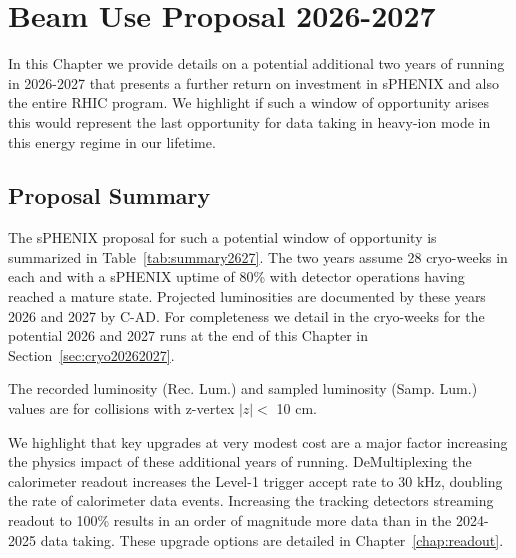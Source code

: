 \chapter{Beam Use Proposal 2026-2027}
\label{chap:beam_use_proposal_extra}

In this Chapter we provide details on a potential additional two years of running in 2026-2027 that presents a further return on investment in sPHENIX and also the entire RHIC program.   We highlight if such a window of opportunity arises this would represent the last opportunity for data taking in heavy-ion mode in this energy regime in our lifetime. 

\section{Proposal Summary}

The sPHENIX proposal for such a potential window of opportunity is summarized in Table~\ref{tab:summary2627}.   The two years assume 28 cryo-weeks in each and with a sPHENIX uptime of 80\% with detector operations having reached a mature state.   Projected luminosities are documented by these years 2026 and 2027 by C-AD.  For completeness we detail in the cryo-weeks for the potential 2026 and 2027 runs at the end of this Chapter in Section~\ref{sec:cryo20262027}.

\begin{table}[h!]
\centering
\caption{The recorded luminosity (Rec. Lum.) and sampled luminosity (Samp. Lum.) values are for collisions with z-vertex $|z|<$ 10 cm.  \label{tab:summary2627}}
\bigskip
\centering

\end{table}

We highlight that key upgrades at very modest cost are a major factor increasing the physics impact of these additional years of running.   DeMultiplexing the calorimeter readout increases the Level-1 trigger accept rate to 30 kHz, doubling the rate of calorimeter data events.    Increasing the tracking detectors streaming readout to 100\% results in an order of magnitude more data than in the 2024-2025 data taking.    These upgrade options are detailed in Chapter~\ref{chap:readout}.


